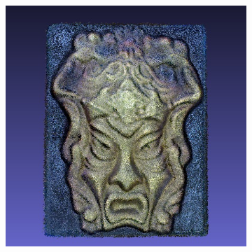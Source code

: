\documentclass[letterpaper, 10 pt, conference]{ieeeconf}  %
\begin{document}
\begin{figure}[t]
\begin{subfigure}[b]{0.45\linewidth}
                \includegraphics[width=\linewidth]{../models/gorgon_color_model.jpg}
                \caption{}
        \end{subfigure}


\end{figure}
\end{document}
